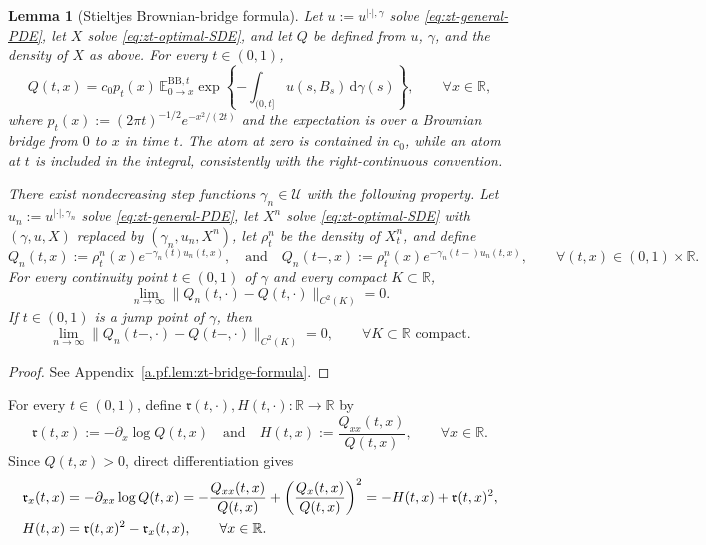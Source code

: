 \documentclass[10pt]{amsart}
\newtheorem{lemma}[lemma]{Lemma}
\theoremstyle{definition}
\theoremstyle{remark}
\numberwithin{equation}{section}
\newcommand{\R}{\mathbb R}
\newcommand{\E}{\mathbb E}
\newcommand{\1}{\mathbf 1}
\newcommand{\cU}{\mathcal U}
\begin{document}
\begin{lemma}[Stieltjes Brownian-bridge formula]
\label{lem:zt-bridge-formula}
Let $u:=u^{|\cdot|,\gamma}$ solve \eqref{eq:zt-general-PDE}, let $X$ solve \eqref{eq:zt-optimal-SDE}, and let $Q$ be defined from $u$, $\gamma$, and the density of $X$ as above. For every $t\in(0,1)$,
\begin{equation}
 Q(t,x)=c_0p_t(x)\,
 \E_{0\to x}^{\mathrm{BB},t}
 \exp\left\{-\int_{(0,t]}u(s,B_s)\,\mathrm d\gamma(s)\right\},
 \qquad \forall x\in\R,
 \label{eq:zt-Stieltjes-bridge}
\end{equation}
where $p_t(x):=(2\pi t)^{-1/2}e^{-x^2/(2t)}$ and the expectation is over a Brownian bridge from $0$ to $x$ in time $t$.  The atom at zero is contained in $c_0$, while an atom at $t$ is included in the integral, consistently with the right-continuous convention.

There exist nondecreasing step functions $\gamma_n\in\cU$ with the following property. Let $u_n:=u^{|\cdot|,\gamma_n}$ solve \eqref{eq:zt-general-PDE}, let $X^n$ solve \eqref{eq:zt-optimal-SDE} with $(\gamma,u,X)$ replaced by $(\gamma_n,u_n,X^n)$, let $\rho_t^n$ be the density of $X_t^n$, and define
\begin{equation*}
 Q_n(t,x):=\rho_t^n(x)e^{-\gamma_n(t)u_n(t,x)},
 \quad\text{and}\quad
 Q_n(t-,x):=\rho_t^n(x)e^{-\gamma_n(t-)u_n(t,x)},
 \qquad \forall (t,x)\in(0,1)\times\R.
\end{equation*}
For every continuity point $t\in(0,1)$ of $\gamma$ and every compact $K\subset\R$,
\begin{equation}
 \lim_{n\to\infty}\|Q_n(t,\cdot)-Q(t,\cdot)\|_{C^2(K)}=0.
 \label{eq:zt-Q-C2-convergence}
\end{equation}
If $t\in(0,1)$ is a jump point of $\gamma$, then
\begin{equation*}
 \lim_{n\to\infty}\|Q_n(t-,\cdot)-Q(t-,\cdot)\|_{C^2(K)}=0,
 \qquad \forall K\subset\R\text{ compact}.
\end{equation*}
\end{lemma}

\begin{proof}
See Appendix~\ref{a.pf.lem:zt-bridge-formula}.
\end{proof}

For every $t\in(0,1)$, define $\mathfrak r(t,\cdot),H(t,\cdot):\R\to\R$ by
\begin{equation}
 \mathfrak r(t,x):=-\partial_x\log Q(t,x)
 \quad\text{and}\quad
 H(t,x):=\frac{Q_{xx}(t,x)}{Q(t,x)},
 \qquad \forall x\in\R.
 \label{eq:zt-r-H-def}
\end{equation}
Since $Q(t,x)>0$, direct differentiation gives
\begin{align}
 \mathfrak r_x(t,x)
 &=-\partial_{xx}\log Q(t,x)
 =-\frac{Q_{xx}(t,x)}{Q(t,x)}
   +\left(\frac{Q_x(t,x)}{Q(t,x)}\right)^2
 =-H(t,x)+\mathfrak r(t,x)^2,\notag\\
 H(t,x)&=\mathfrak r(t,x)^2-\mathfrak r_x(t,x),
 \qquad \forall x\in\R.
 \label{eq:zt-r-H-identity}
\end{align}
\end{document}
